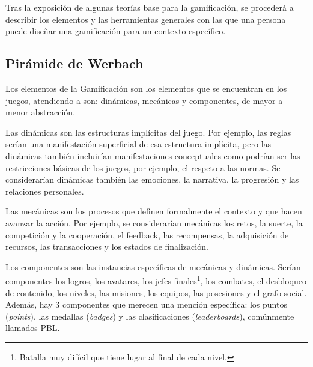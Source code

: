 Tras la exposición de algunas teorías base para la gamificación, se procederá a describir los elementos y las herramientas generales con las que una persona puede diseñar una gamificación para un contexto específico.


\subsection{Pirámide de Werbach}

Los elementos de la Gamificación son los elementos que se encuentran en los juegos, atendiendo a  \cite{werbach2012win} son: dinámicas, mecánicas y componentes, de mayor a menor abstracción.

%
Las dinámicas son las estructuras implícitas del juego. 
%
Por ejemplo, las reglas serían una manifestación superficial de esa estructura implícita, pero las dinámicas también incluirían manifestaciones conceptuales como podrían ser las restricciones básicas de los juegos, por ejemplo, el respeto a las normas.
%
Se considerarían dinámicas también las emociones, la narrativa, la progresión y las relaciones personales.
%

 Las mecánicas son los procesos que definen formalmente el contexto y que hacen avanzar la acción. 
%
\label{mecanicas}
%
Por ejemplo, se considerarían mecánicas los retos, la suerte, la competición y la cooperación, el feedback, las recompensas, la adquisición de recursos, las transacciones y los estados de finalización.


 Los componentes son las instancias específicas de mecánicas y dinámicas. 
%
Serían componentes los logros, los avatares, los jefes finales\footnote{Batalla muy difícil que tiene lugar al final de cada nivel.}, los combates, el desbloqueo de contenido, los niveles, las misiones, los equipos, las posesiones y el grafo social.
%
Además, hay 3 componentes que merecen una mención específica: los puntos (\textit{points}), las medallas (\textit{badges}) y las clasificaciones (\textit{leaderboards}), comúnmente llamados \gls{PBL}.

